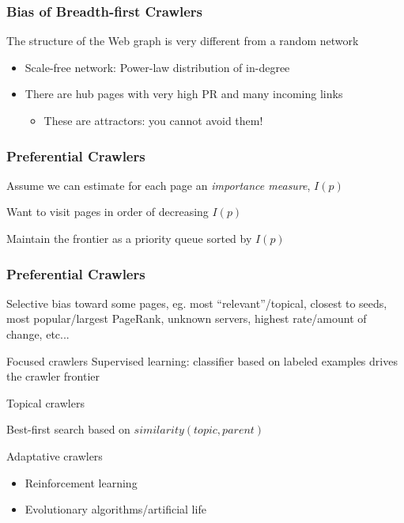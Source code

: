 \documentclass{beamer}
\begin{document}
\begin{frame} \frametitle{Bias of Breadth-first Crawlers}


\begin{block}{The structure of the Web graph is very different from a random network}

\begin{itemize}
\item Scale-free network: Power-law distribution of in-degree
\item There are hub pages with very high PR and many incoming links
\begin{itemize}
\item These are attractors: you cannot avoid them!
\end{itemize}
\end{itemize}

\end{block}

\end{frame}


\begin{frame} \frametitle{Preferential Crawlers}

Assume we can estimate for each page an {\em importance measure}, $I(p)$

Want to visit pages in order of decreasing $I(p)$

Maintain the frontier as a priority queue sorted by $I(p)$


\end{frame}


\begin{frame} \frametitle{Preferential Crawlers}

Selective bias toward some pages, eg. most ``relevant''/topical, closest to seeds, most popular/largest PageRank, unknown servers, highest rate/amount of change, etc...

\begin{block}{Focused crawlers}
Supervised learning: classifier based on labeled examples drives the
crawler frontier
\end{block}


\begin{block}{Topical crawlers}

Best-first search based on $similarity(topic, parent)$
\end{block}

\begin{block}{Adaptative crawlers}
\begin{itemize}
  \item Reinforcement learning
  \item Evolutionary algorithms/artificial life
\end{itemize}
\end{block}

\end{frame}
\end{document}
